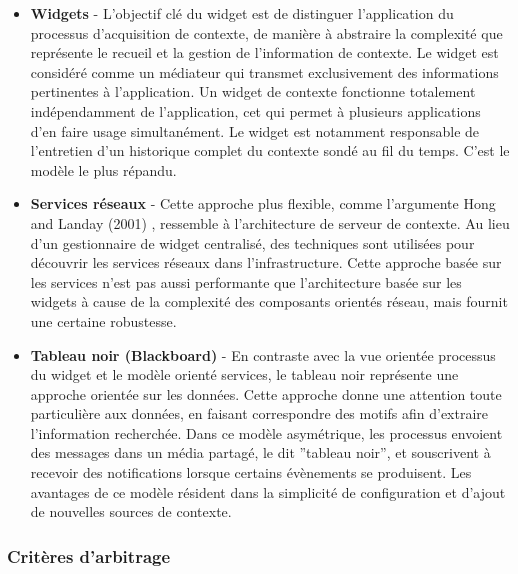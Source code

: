\begin{itemize}
    \item \textbf{Widgets} -
        L'objectif clé du widget est de distinguer l'application du
        processus d'acquisition de contexte, de manière à abstraire la
        complexité que représente le recueil et la gestion de
        l'information de contexte. Le widget est considéré comme un
        médiateur qui transmet exclusivement des informations
        pertinentes à l'application. Un widget de contexte fonctionne
        totalement indépendamment de l'application, cet qui permet à
        plusieurs applications d'en faire usage simultanément. Le
        widget est notamment responsable de l'entretien d'un historique
        complet du contexte sondé au fil du temps. C'est le modèle le
        plus répandu.

    \item \textbf{Services réseaux} -
        Cette approche plus flexible, comme l'argumente Hong
        and Landay (2001) \cite{hong_infrastructure_2001}, ressemble à
        l'architecture de serveur de contexte. Au lieu d'un
        gestionnaire de widget centralisé, des techniques sont utilisées
        pour découvrir les services réseaux dans l'infrastructure. Cette
        approche basée sur les services n'est pas aussi performante que
        l'architecture basée sur les widgets à cause de la complexité
        des composants orientés réseau, mais fournit une certaine
        robustesse.

    \item \textbf{Tableau noir (Blackboard)} -
        En contraste avec la vue orientée processus du widget et le modèle
        orienté services, le tableau noir représente une approche orientée sur
        les données. Cette approche donne une attention toute particulière aux
        données, en faisant correspondre des motifs afin d'extraire
        l'information recherchée. Dans ce modèle asymétrique, les processus
        envoient des messages dans un média partagé, le dit ''tableau noir'', et
        souscrivent à recevoir des notifications lorsque certains évènements se
        produisent. Les avantages de ce modèle résident dans la simplicité de
        configuration et d'ajout de nouvelles sources de contexte.
\end{itemize}

\subsubsection{Critères d'arbitrage}

